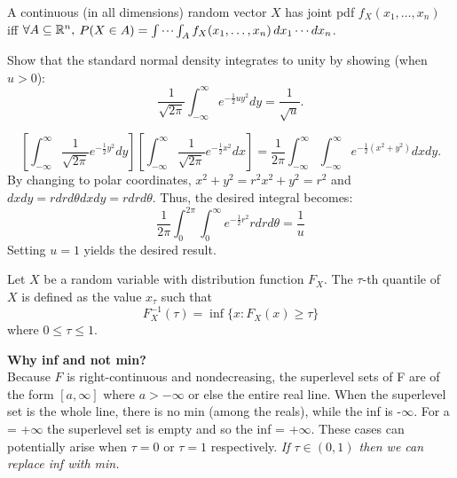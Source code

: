 \documentclass[DIV=14,titlepage=false]{scrreprt}
\begin{document}
A continuous (in all dimensions) random vector $ X $ has joint pdf $ f_X(x_1, \dotsc, x_n) $ iff $ \forall A \subseteq \mathbb{R}^n, $ $ P(X \in A) = \idotsint_A f_X(x_1, \dotsc, x_n) \, dx_1 \dotsm dx_n $.
\vspace{5pt}
\begin{exercise}
  Show that the standard normal density integrates to unity by showing (when \( u > 0 \)):
  \[
\frac{1}{\sqrt{2\pi}} \int_{-\infty}^{\infty} e^{-\frac{1}{2}u y^2} dy = \frac{1}{\sqrt{u}}.
\]
\end{exercise}
\begin{solution}
\[\left[
\int_{-\infty}^{\infty} \frac{1}{\sqrt{2\pi}} e^{-\frac{1}{2}y^2} dy
\right]
\left[
\int_{-\infty}^{\infty} \frac{1}{\sqrt{2\pi}} e^{-\frac{1}{2}x^2} dx
\right] 
= \frac{1}{2\pi} \int_{-\infty}^{\infty} \int_{-\infty}^{\infty} e^{-\frac{1}{2}(x^2+y^2)} dxdy.
\]
By changing to polar coordinates, $x^2+y^2=r^2x^2+y^2=r^2$ and $dxdy=rdrd\theta dxdy=rdrd\theta $. Thus, the desired integral becomes:
\[ \frac{1}{2\pi} \int_{0}^{2\pi} \int_{0}^{\infty} e^{-\frac{1}{2}r^2} rdrd\theta = \frac{1}{u}\]
Setting $u=1$ yields the desired result.
\end{solution}
\begin{definition}
  Let \( X \) be a random variable with distribution function \( F_X \). The \(\tau\)-th quantile of \( X \) is defined as the value \( x_\tau \) such that
\[ F_X^{-1}(\tau) = \inf\{ x : F_X(x) \geq \tau \} \]
where \( 0 \leq \tau \leq 1 \).
\end{definition}
\vspace{5pt}
\textbf{Why inf and not min?}\\
Because $F$ is right-continuous and nondecreasing, the superlevel sets of F are of the form $[a,\infty]$ where $a>-\infty$ or else the entire real line. When the superlevel set is the whole line, there is no min (among the reals), while the inf is -$ \infty$. For a = +$ \infty$ the superlevel set is empty and so the inf = +$\infty$. These cases can potentially arise when $\tau=0$ or $\tau = 1$ respectively.
\textit{If $\tau \in (0,1)$ then we can replace inf with min.}
\end{document}
